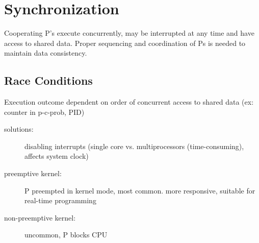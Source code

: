 \section*{Synchronization}
Cooperating P's execute concurrently, may be interrupted at any time and have access to shared data. Proper sequencing and coordination of Ps is needed to maintain data consistency.
\subsection*{Race Conditions}
Execution outcome dependent on order of concurrent access to shared data (ex: counter in p-c-prob, PID)
\begin{description}
        \item[solutions:] disabling interrupts (single core vs. multiprocessors (time-consuming), affects system clock)
        \item[preemptive kernel:] P preempted in kernel mode, most common. more responsive, suitable for real-time programming
        \item [non-preemptive kernel:] uncommon, P blocks CPU
\end{description}
